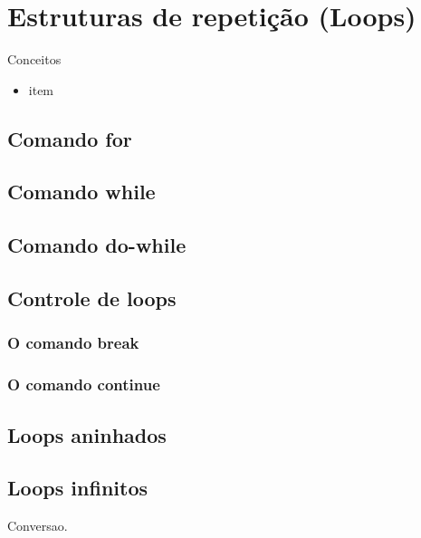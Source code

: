 
\chapter{Estruturas de repetição (Loops)}
Conceitos

\begin{itemize}
  \item item
\end{itemize}

\section{Comando for}
\section{Comando while}
\section{Comando do-while}

\section{Controle de loops}
\subsection{O comando break}
\subsection{O comando continue}

\section{Loops aninhados}
\section{Loops infinitos}

Conversao.




